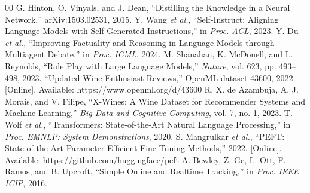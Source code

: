 \documentclass[conference]{IEEEtran}
\begin{document}
\begin{thebibliography}{00}
 G. Hinton, O. Vinyals, and J. Dean, ``Distilling the Knowledge in a Neural Network,'' arXiv:1503.02531, 2015.
 Y. Wang \textit{et al.}, ``Self-Instruct: Aligning Language Models with Self-Generated Instructions,'' in \textit{Proc. ACL}, 2023.
 Y. Du \textit{et al.}, ``Improving Factuality and Reasoning in Language Models through Multiagent Debate,'' in \textit{Proc. ICML}, 2024.
 M. Shanahan, K. McDonell, and L. Reynolds, ``Role Play with Large Language Models,'' \textit{Nature}, vol. 623, pp. 493--498, 2023.
 ``Updated Wine Enthusiast Reviews,'' OpenML dataset 43600, 2022. [Online]. Available: https://www.openml.org/d/43600
 R. X. de Azambuja, A. J. Morais, and V. Filipe, ``X-Wines: A Wine Dataset for Recommender Systems and Machine Learning,'' \textit{Big Data and Cognitive Computing}, vol. 7, no. 1, 2023.
 T. Wolf \textit{et al.}, ``Transformers: State-of-the-Art Natural Language Processing,'' in \textit{Proc. EMNLP: System Demonstrations}, 2020.
 S. Mangrulkar \textit{et al.}, ``PEFT: State-of-the-Art Parameter-Efficient Fine-Tuning Methods,'' 2022. [Online]. Available: https://github.com/huggingface/peft
 A. Bewley, Z. Ge, L. Ott, F. Ramos, and B. Upcroft, ``Simple Online and Realtime Tracking,'' in \textit{Proc. IEEE ICIP}, 2016.
\end{thebibliography}
\end{document}
